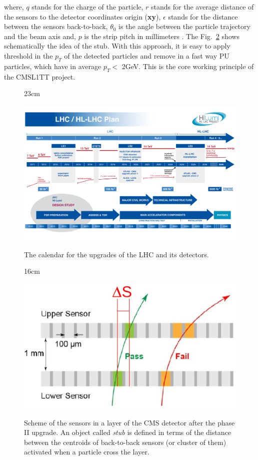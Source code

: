 where, $q$ stands for the charge of the particle, $r$ stands for the average distance of the sensors to the detector coordinates origin (\textbf{xy}), $\epsilon$ stands for the distance between the sensors back-to-back, $\theta_{0}$ is the angle between the particle trajectory and the beam axis and, $p$ is the strip pitch in millimeters \cite{bib:CMS-TDR-17-001}. The Fig.~\ref{fig:stub_definition} shows schematically the idea of the stub. With this approach, it is easy to apply threshold in the $p_{T}$ of the detected particles and remove in a fast way PU particles, which have in average $p_{T} <$ 2GeV. This is the core working principle of the CMSL1TT project.

\begin{landscape}
	\begin{figure}[htbp]{23cm}
		\caption{The calendar for the upgrades of the LHC and its detectors.}
		\centering
		\includegraphics[scale=0.9,trim={0cm 1cm 0cm 1cm},clip]{AppendixCMSL1TT/figs/Schedule_HLLHC}
		\label{fig:lhc_calendar}
	\end{figure}
\end{landscape}

\begin{figure}[htbp]{16cm}
	\caption{Scheme of the sensors in a layer of the CMS detector after the phase II upgrade. An object called \textit{stub} is defined in terms of the distance between the centroids of back-to-back sensors (or cluster of them) activated when a particle cross the layer.}
	\centering
	\includegraphics[scale=0.6]{AppendixCMSL1TT/figs/stub_definition}
	\label{fig:stub_definition}
\end{figure}

